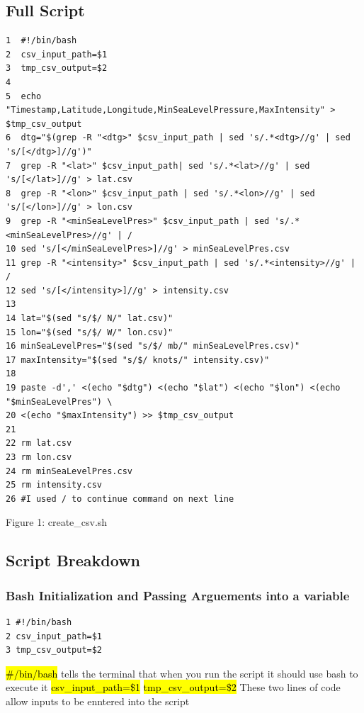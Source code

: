 \documentclass[]{article}
\begin{document}
\subsection{Full Script}
\begin{tcolorbox}[colback=white, colframe=black, boxrule=0.5pt, arc=2mm, 
    title=create\_csv.sh, width=6.7in, fonttitle=\bfseries, listing only, listing options={language=sh, basicstyle=\ttfamily}]
    \begin{verbatim}
1  #!/bin/bash
2  csv_input_path=$1
3  tmp_csv_output=$2
4
5  echo "Timestamp,Latitude,Longitude,MinSeaLevelPressure,MaxIntensity" > $tmp_csv_output
6  dtg="$(grep -R "<dtg>" $csv_input_path | sed 's/.*<dtg>//g' | sed 's/[</dtg>]//g')"
7  grep -R "<lat>" $csv_input_path| sed 's/.*<lat>//g' | sed 's/[</lat>]//g' > lat.csv
8  grep -R "<lon>" $csv_input_path | sed 's/.*<lon>//g' | sed 's/[</lon>]//g' > lon.csv
9  grep -R "<minSeaLevelPres>" $csv_input_path | sed 's/.*<minSeaLevelPres>//g' | /
10 sed 's/[</minSeaLevelPres>]//g' > minSeaLevelPres.csv
11 grep -R "<intensity>" $csv_input_path | sed 's/.*<intensity>//g' | / 
12 sed 's/[</intensity>]//g' > intensity.csv
13 
14 lat="$(sed "s/$/ N/" lat.csv)"
15 lon="$(sed "s/$/ W/" lon.csv)"
16 minSeaLevelPres="$(sed "s/$/ mb/" minSeaLevelPres.csv)"
17 maxIntensity="$(sed "s/$/ knots/" intensity.csv)"
18
19 paste -d',' <(echo "$dtg") <(echo "$lat") <(echo "$lon") <(echo "$minSeaLevelPres") \
20 <(echo "$maxIntensity") >> $tmp_csv_output
21
22 rm lat.csv
23 rm lon.csv
24 rm minSeaLevelPres.csv
25 rm intensity.csv
26 #I used / to continue command on next line
    \end{verbatim}
\end{tcolorbox}
\begin{center}
    Figure 1: create\_csv.sh
\end{center}
\subsection{Script Breakdown}
\subsubsection{Bash Initialization and Passing Arguements into a variable}
\begin{tcolorbox}[colback=white, colframe=black, boxrule=0.5pt, arc=2mm, 
    title=Bash Initialization and Passing Arguements into a variable, width=6.7in, fonttitle=\bfseries, listing only, listing options={language=sh, basicstyle=\ttfamily}]
    \begin{verbatim}
1 #!/bin/bash
2 csv_input_path=$1
3 tmp_csv_output=$2
    \end{verbatim}
\hl{\#\!/bin/bash}\newline
tells the terminal that when you run the script it should use bash to execute it\newline
\hl{csv\_input\_path=\$1}\newline
\hl{tmp\_csv\_output=\$2}\newline
These two lines of code allow inputs to be enntered into the script
\end{tcolorbox}
\end{document}
